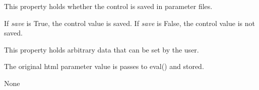 \documentclass[letterpaper,10pt,english]{sphinxmanual}
\begin{document}
\begin{fulllineitems}

\begin{fulllineitems}
\label{api:qwt.Knob.save}
This property holds whether the control is saved in parameter files.

If \emph{save} is True, the control value is saved.
If \emph{save} is False, the control value is not saved.

\end{fulllineitems}


\begin{fulllineitems}
\label{api:qwt.Knob.user}
This property holds arbitrary data that can be set by the user.

The original html parameter value is passes to eval() and stored.

\end{fulllineitems}


\begin{fulllineitems}
\label{api:qwt.Knob.value}
None

\end{fulllineitems}


\end{fulllineitems}

\end{document}
